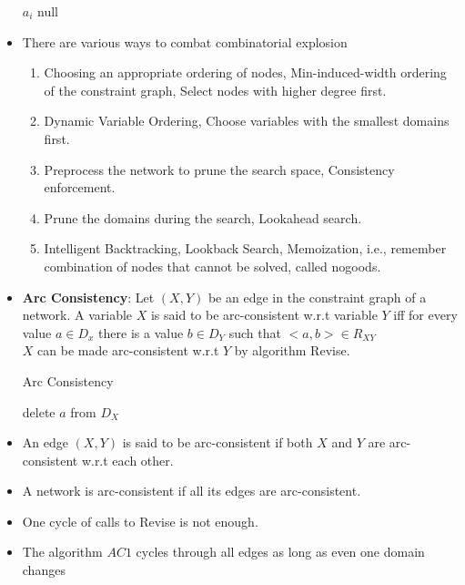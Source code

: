 \documentclass[a4paper]{article}
\begin{document}
\begin{itemize}
\begin{algorithm}[H]
\begin{algorithmic}[1]
                    \State \Return $a_i$
                \EndIf
            \EndWhile
            \State \Return null
        \end{algorithmic}
    \end{algorithm}
    \item There are various ways to combat combinatorial explosion
    \begin{enumerate}
        \item Choosing an appropriate ordering of nodes, Min-induced-width ordering of the constraint graph, Select nodes with higher degree first.
        \item Dynamic Variable Ordering, Choose variables with the smallest domains first.
        \item Preprocess the network to prune the search space, Consistency enforcement.
        \item Prune the domains during the search, Lookahead search.
        \item Intelligent Backtracking, Lookback Search, Memoization, i.e., remember combination of nodes that cannot be solved, called nogoods.
    \end{enumerate}
    \item \textbf{Arc Consistency}: Let $(X,Y)$ be an edge in the constraint graph of a network. A variable $X$ is said to be arc-consistent w.r.t variable $Y$ iff for every value $a\in D_x$ there is a value $b\in D_Y$ such that $<a,b>\in R_{XY}$\\
    $X$ can be made arc-consistent w.r.t $Y$ by algorithm Revise.
    \begin{algorithm}[H]
        \caption{Arc Consistency}
        \begin{algorithmic}[1]
            \Statex {}
                    \State delete $a$ from $D_X$
                \EndIf
            \EndFor
        \end{algorithmic}
    \end{algorithm}
    \item An edge $(X,Y)$ is said to be arc-consistent if both $X$ and $Y$ are arc-consistent w.r.t each other.
    \item A network is arc-consistent if all its edges are arc-consistent.
    \item One cycle of calls to Revise is not enough.
    \item The algorithm $AC1$ cycles through all edges as long as even one domain changes

\end{itemize}
\end{document}
